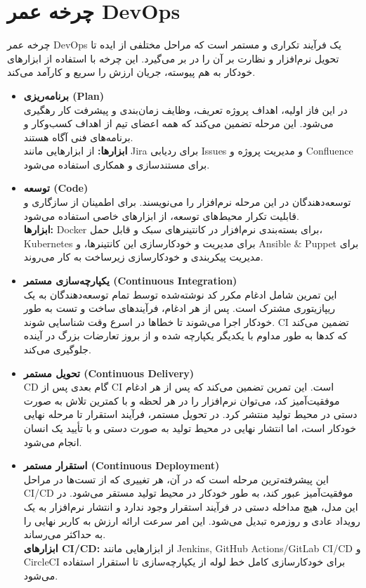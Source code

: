 \section{چرخه عمر DevOps}
چرخه عمر DevOps یک فرآیند تکراری و مستمر است که مراحل مختلفی از ایده تا تحویل نرم‌افزار و نظارت بر آن را در بر می‌گیرد. این چرخه با استفاده از ابزارهای خودکار به هم پیوسته، جریان ارزش را سریع و کارآمد می‌کند.

\begin{itemize}
    \item \textbf{برنامه‌ریزی (Plan)} \\
    در این فاز اولیه، اهداف پروژه تعریف، وظایف زمان‌بندی و پیشرفت کار رهگیری می‌شود. این مرحله تضمین می‌کند که همه اعضای تیم از اهداف کسب‌وکار و برنامه‌های فنی آگاه هستند. \\
    \textbf{ابزارها:} از ابزارهایی مانند Jira برای ردیابی Issues و مدیریت پروژه و Confluence برای مستندسازی و همکاری استفاده می‌شود.

    \item \textbf{توسعه (Code)} \\
    توسعه‌دهندگان در این مرحله نرم‌افزار را می‌نویسند. برای اطمینان از سازگاری و قابلیت تکرار محیط‌های توسعه، از ابزارهای خاصی استفاده می‌شود. \\
    \textbf{ابزارها:} Docker برای بسته‌بندی نرم‌افزار در کانتینرهای سبک و قابل حمل، Kubernetes برای مدیریت و خودکارسازی این کانتینرها، و Ansible \& Puppet برای مدیریت پیکربندی و خودکارسازی زیرساخت به کار می‌روند.

    \item \textbf{یکپارچه‌سازی مستمر (Continuous Integration)} \\
    این تمرین شامل ادغام مکرر کد نوشته‌شده توسط تمام توسعه‌دهندگان به یک ریپازیتوری مشترک است. پس از هر ادغام، فرآیندهای ساخت و تست به طور خودکار اجرا می‌شوند تا خطاها در اسرع وقت شناسایی شوند. CI تضمین می‌کند که کدها به طور مداوم با یکدیگر یکپارچه شده و از بروز تعارضات بزرگ در آینده جلوگیری می‌کند.

    \item \textbf{تحویل مستمر (Continuous Delivery)} \\
    CD گام بعدی پس از CI است. این تمرین تضمین می‌کند که پس از هر ادغام موفقیت‌آمیز کد، می‌توان نرم‌افزار را در هر لحظه و با کمترین تلاش به صورت دستی در محیط تولید منتشر کرد. در تحویل مستمر، فرآیند استقرار تا مرحله نهایی خودکار است، اما انتشار نهایی در محیط تولید به صورت دستی و با تأیید یک انسان انجام می‌شود.

    \item \textbf{استقرار مستمر (Continuous Deployment)} \\
    این پیشرفته‌ترین مرحله است که در آن، هر تغییری که از تست‌ها در مراحل CI/CD موفقیت‌آمیز عبور کند، به طور خودکار در محیط تولید مستقر می‌شود. در این مدل، هیچ مداخله دستی در فرآیند استقرار وجود ندارد و انتشار نرم‌افزار به یک رویداد عادی و روزمره تبدیل می‌شود. این امر سرعت ارائه ارزش به کاربر نهایی را به حداکثر می‌رساند. \\
    \textbf{ابزارهای CI/CD:} از ابزارهایی مانند Jenkins, GitHub Actions/GitLab CI/CD و CircleCI برای خودکارسازی کامل خط لوله از یکپارچه‌سازی تا استقرار استفاده می‌شود.


\end{itemize}
